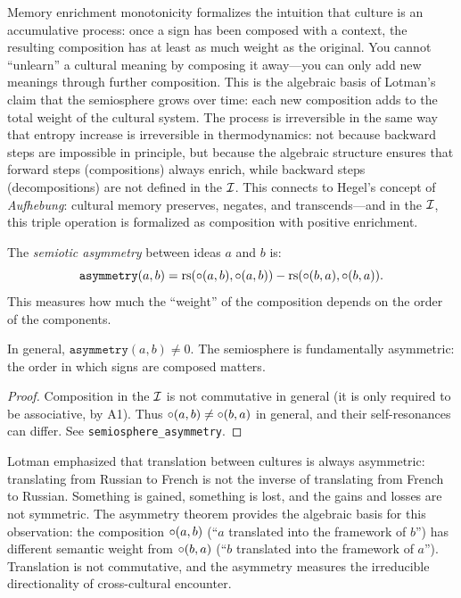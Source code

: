 \begin{interpretation}
Memory enrichment monotonicity formalizes the intuition that culture is an accumulative process: once a sign has been composed with a context, the resulting composition has at least as much weight as the original. You cannot ``unlearn'' a cultural meaning by composing it away---you can only add new meanings through further composition. This is the algebraic basis of Lotman's claim that the semiosphere grows over time: each new composition adds to the total weight of the cultural system. The process is irreversible in the same way that entropy increase is irreversible in thermodynamics: not because backward steps are impossible in principle, but because the algebraic structure ensures that forward steps (compositions) always enrich, while backward steps (decompositions) are not defined in the $\mathcal{I}$. This connects to Hegel's concept of \emph{Aufhebung}: cultural memory preserves, negates, and transcends---and in the $\mathcal{I}$, this triple operation is formalized as composition with positive enrichment.
\end{interpretation}

\begin{definition}
\label{def:asymmetry}
The \emph{semiotic asymmetry} between ideas $a$ and $b$ is:
\[
  \texttt{asymmetry}(a, b) = \mathrm{rs}(\circ(a, b), \circ(a, b))
  - \mathrm{rs}(\circ(b, a), \circ(b, a)).
\]
This measures how much the ``weight'' of the composition depends on
the order of the components.
\end{definition}

\begin{theorem}
\label{thm:semiosphere-asymmetry}
In general, $\texttt{asymmetry}(a, b) \neq 0$. The semiosphere is
fundamentally asymmetric: the order in which signs are composed
matters.
\end{theorem}

\begin{proof}
Composition in the $\mathcal{I}$ is not commutative in general (it is only
required to be associative, by A1). Thus $\circ(a, b) \neq
\circ(b, a)$ in general, and their self-resonances can differ.
See \texttt{semiosphere\_asymmetry}.
\end{proof}

\begin{interpretation}
Lotman emphasized that translation between cultures is always
asymmetric: translating from Russian to French is not the inverse
of translating from French to Russian. Something is gained, something
is lost, and the gains and losses are not symmetric. The asymmetry
theorem provides the algebraic basis for this observation: the
composition $\circ(a, b)$ (``$a$ translated into the framework of
$b$'') has different semantic weight from $\circ(b, a)$ (``$b$
translated into the framework of $a$''). Translation is not
commutative, and the asymmetry measures the irreducible directionality
of cross-cultural encounter.
\end{interpretation}

